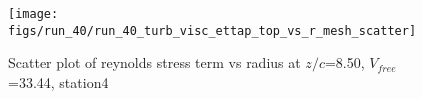 \begin{figure}[H]
\centering
\texttt{[image: figs/run\_40/run\_40\_turb\_visc\_ettap\_top\_vs\_r\_mesh\_scatter]}
\caption{Scatter plot of reynolds stress term vs radius at $z/c$=8.50, $V_{free}$=33.44, station4}
\label{fig:run_40_turb_visc_ettap_top_vs_r_mesh_scatter}
\end{figure}


